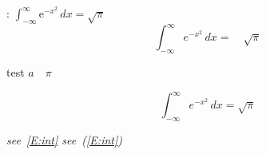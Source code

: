\documentclass{amsart}
\begin{document}
: \begin{math}\int_{-\infty}^\infty \mathrm{e}^{-x^2}\,dx = \sqrt\pi\end{math}
\[
    \int_{-\infty}^\infty e^{-x^2}\,dx =\quad \sqrt\pi
\]

test $a \quad\pi$

\begin{equation}
    \label{E:int}
    \int_{-\infty}^\infty e^{-x^2}\,dx = \sqrt\pi
\end{equation}

{\itshape see~\eqref{E:int} see~(\ref{E:int})}
\end{document}
